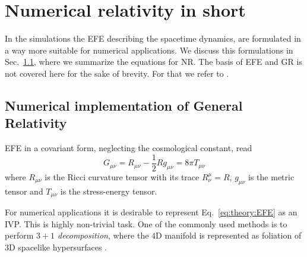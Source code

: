 \chapter{Numerical relativity in short}\label{ch:nr_methods}

In the simulations the \ac{EFE} describing the spacetime dynamics, are formulated in a 
way more suitable for numerical applications. We discuss this formulations in 
Sec.~\ref{sec:nr_methods:nr}, where we summarize the equations for \ac{NR}.
The basis of \ac{EFE} and \ac{GR} is not covered here for the sake of brevity. For that we 
refer to \citet{Arnowitt:1962hi,Landau:1982dva,Wald:1984,Misner:1973,Baumgarte:2002jm}.


\section{Numerical implementation of General Relativity}\label{sec:nr_methods:nr}


\ac{EFE} in a covariant form, neglecting the cosmological constant, read
%
\begin{equation}
    G_{\mu\nu} = R_{\mu\nu} - \frac{1}{2} R g_{\mu\nu} = 8\pi T_{\mu\nu}
    \label{eq:theory:EFE}
\end{equation}
%
%
where $R_{\mu\nu}$ is the Ricci curvature tensor with its trace 
$R^{\mu}_{\nu} = R$, $g_{\mu\nu}$ is the metric tensor and 
$T_{\mu\nu}$ is the stress-energy tensor.

For numerical applications it is desirable to represent Eq.~\eqref{eq:theory:EFE} 
as an \ac{IVP}.
This is highly non-trivial task. One of the commonly used methods is to perform 
\textit{$3+1$ decomposition}, where the $4$D 
manifold is represented as foliation of $3$D spacelike hypersurfaces 
\citep{Alcubierre:2008,Baumgarte:2010,Gourgoulhon:2007ue,Rezzolla:2013}.


